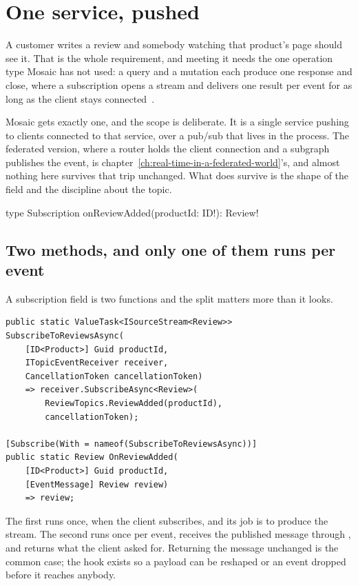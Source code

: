 \section{One service, pushed}
\label{sec:ch05-one-service-pushed}

A customer writes a review and somebody watching that product's page should see
it. That is the whole requirement, and meeting it needs the one operation type
Mosaic has not used: a query and a mutation each produce one response and close,
where a subscription opens a stream and delivers one result per event for as
long as the client stays connected~\autocite{chillicream2026subscriptions}.

Mosaic gets exactly one, and the scope is deliberate. It is a single service pushing to
clients connected to that service, over a pub/sub that lives in the process. The
federated version, where a router holds the client connection and a subgraph
publishes the event, is chapter~\ref{ch:real-time-in-a-federated-world}'s, and
almost nothing here survives that trip unchanged. What does survive is the
shape of the field and the discipline about the topic.

\begin{graphqlsdl}
type Subscription {
  onReviewAdded(productId: ID!): Review!
}
\end{graphqlsdl}

\subsection*{Two methods, and only one of them runs per event}

%
A subscription field is two functions and the split matters more than it looks.

\begin{verbatim}
public static ValueTask<ISourceStream<Review>> SubscribeToReviewsAsync(
    [ID<Product>] Guid productId,
    ITopicEventReceiver receiver,
    CancellationToken cancellationToken)
    => receiver.SubscribeAsync<Review>(
        ReviewTopics.ReviewAdded(productId),
        cancellationToken);

[Subscribe(With = nameof(SubscribeToReviewsAsync))]
public static Review OnReviewAdded(
    [ID<Product>] Guid productId,
    [EventMessage] Review review)
    => review;
\end{verbatim}

The first runs once, when the client subscribes, and its job is to produce the
stream. The second runs once per event, receives the published message through
\code{[EventMessage]}, and returns what the client asked for. Returning the
message unchanged is the common case; the hook exists so a payload can be
reshaped or an event dropped before it reaches anybody.

